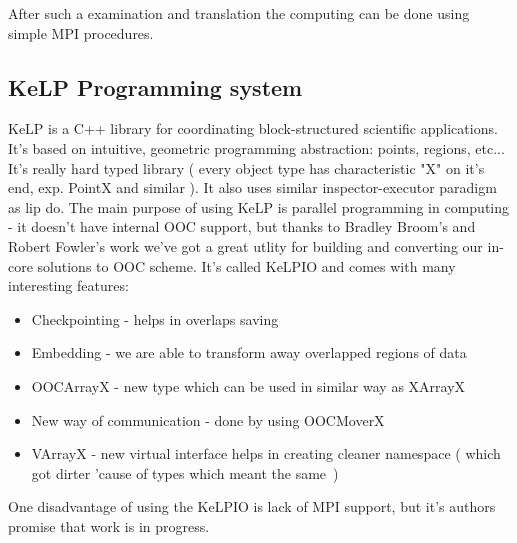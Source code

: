 After such a examination and translation the computing can be done using simple MPI procedures.

\subsection{KeLP Programming system}
KeLP \cite{kelp} is a C++ library for coordinating block-structured scientific applications.
It's based on intuitive, geometric programming abstraction: points, regions, etc... It's really hard typed library ( every object type has characteristic "X" on it's end, exp. PointX and similar ).
It also uses similar inspector-executor paradigm as lip do.
The main purpose of using KeLP is parallel programming in computing - it doesn't have internal OOC support, but thanks to Bradley Broom's and Robert Fowler's work we've got a great utlity for building and converting our in-core solutions to OOC scheme.  
It's called KeLPIO \cite{kelpio} and comes with many interesting features:
\begin{itemize}
	\item{Checkpointing} - helps in overlaps saving
	\item{Embedding} - we are able to transform away overlapped regions of data
	\item{OOCArrayX} - new type which can be used in similar way as XArrayX
	\item{New way of communication} - done by using OOCMoverX
	\item{VArrayX} - new virtual interface helps in creating cleaner namespace ( which got dirter 'cause of types which meant the same~)
\end{itemize}
One disadvantage of using the KeLPIO is lack of MPI support, but it's authors promise that work is in progress.
